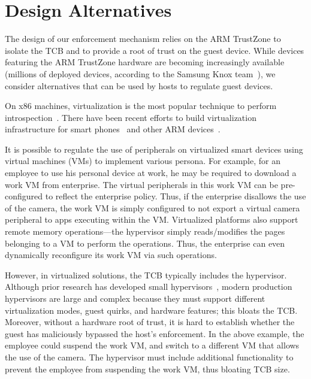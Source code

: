 \section{Design Alternatives}
\label{section:discussion}



\label{section:discussion:alternatives}
%
The design of our enforcement mechanism relies on the ARM TrustZone to isolate
the TCB and to provide a root of trust on the guest device. While devices
featuring the ARM TrustZone hardware are becoming increasingly available
(millions of deployed devices, according to the Samsung Knox
team~\cite{knox:ccs14}), we consider alternatives that can be used by
hosts to regulate guest devices.

%
On x86 machines, virtualization is the most popular technique to perform
introspection~\cite{chennoble:hotos01,vmi:ndss03}.  There have been recent
efforts to build virtualization infrastructure for smart
phones~\cite{cells:sosp11,cox:hotmobile07,vmwareverizon} and other ARM
devices~\cite{kvmarm:asplos14}.

It is possible to regulate the use of peripherals on virtualized smart devices
using virtual machines (VMs) to implement various persona. For example, for an
employee to use his personal device at work, he may be required to download a
work VM from enterprise. The virtual peripherals in this work VM can be
pre-configured to reflect the enterprise policy. Thus, if the enterprise
disallows the use of the camera, the work VM is simply configured to not export
a virtual camera peripheral to apps executing within the VM. Virtualized
platforms also support remote memory operations---the hypervisor simply
reads/modifies the pages belonging to a VM to perform the operations. Thus, the
enterprise can even dynamically reconfigure its work VM via such operations.

However, in virtualized solutions, the TCB typically includes the hypervisor.
Although prior research has developed small hypervisors~\cite{nova:eurosys09},
modern production hypervisors are large and complex because they must support
different virtualization modes, guest quirks, and hardware features; this
bloats the TCB. Moreover, without a hardware root of trust, it is hard to
establish whether the guest has maliciously bypassed the host's enforcement. In
the above example, the employee could suspend the work VM, and switch to a
different VM that allows the use of the camera. The hypervisor must include
additional functionality to prevent the employee from suspending the work VM,
thus bloating TCB size.

